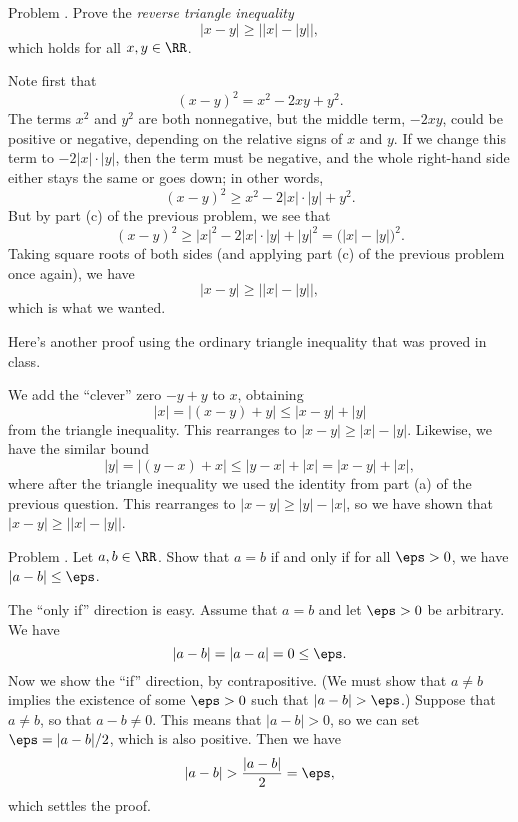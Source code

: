 \proclaim Problem \advthm. Prove the {\it reverse triangle inequality}
$$ |x-y| \ge \bigl| |x|-|y|\bigr|,$$
which holds for all $x,y\in \RR$.

\proof Note first that
$$(x-y)^2 = x^2 - 2xy + y^2.$$
The terms $x^2$ and $y^2$ are both nonnegative, but the middle term, $-2xy$, could be positive or negative,
depending on the relative signs of $x$ and $y$. If we change this term to $-2|x|\cdot |y|$, then
the term must be negative, and the whole right-hand side either stays the same or goes down; in other words,
$$(x-y)^2 \ge x^2 - 2|x|\cdot |y| + y^2.$$
But by part (c) of the previous problem, we see that
$$(x-y)^2 \ge |x|^2 - 2|x|\cdot |y| + |y|^2 = \bigl( |x|- |y|\bigr)^2.$$
Taking square roots of both sides (and applying part (c) of the previous problem once again), we have
$$|x-y| \ge \bigl| |x| - |y| \bigr|,$$
which is what we wanted.\slug

Here's another proof using the ordinary triangle inequality that was proved in class.

\medskip{}\enspace We add the ``clever'' zero $-y+y$ to $x$, obtaining
$$|x| = \bigl| (x-y) + y\bigr| \le |x-y| + |y|$$
from the triangle inequality. This rearranges to $|x-y| \ge |x|-|y|$. Likewise, we have the similar bound
$$|y| = \bigl| (y-x) + x\bigr| \le |y-x| + |x| = |x-y| + |x|,$$
where after the triangle inequality we used the identity from part (a) of the previous question.
This rearranges to $|x-y| \ge |y|-|x|$, so we have shown that $|x-y| \ge \bigl| |x|-|y|\bigr|$.\slug

\proclaim Problem \advthm. Let $a,b\in \RR$. Show that $a=b$ if and only if for all $\eps>0$, we have
$|a-b|\le \eps$.

\proof The ``only if'' direction is easy. Assume that $a=b$ and let $\eps > 0$ be arbitrary. We have
$$|a-b| = |a-a| = 0 \le \eps.$$
Now we show the ``if'' direction, by contrapositive. (We must show that $a\ne b$ implies
the existence of some $\eps > 0$ such that $|a-b| > \eps$.) Suppose that $a\ne b$, so that $a-b\ne 0$.
This means that $|a-b| > 0$, so we can set $\eps = |a-b| / 2$, which is also positive. Then we have
$$|a-b| > {|a-b|\over 2} = \eps,$$
which settles the proof.\slug



\bye
